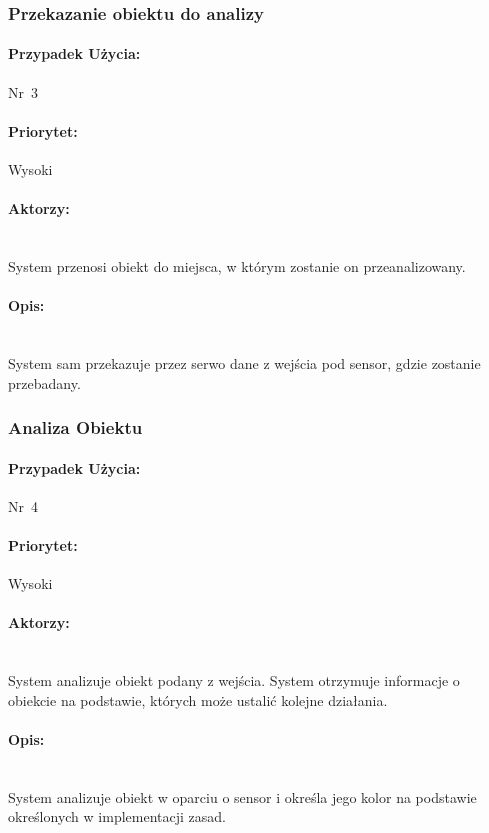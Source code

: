 \documentclass[12pt]{article}
\begin{document}
\subsubsection{Przekazanie obiektu do analizy}
\paragraph{Przypadek Użycia:}\mbox{Nr 3}
\paragraph{Priorytet:}\mbox{Wysoki}	
\paragraph{Aktorzy:}\mbox{} \\
System przenosi obiekt do miejsca, w którym zostanie on przeanalizowany.
\paragraph{Opis:}\mbox{} \\
System sam przekazuje przez serwo dane z wejścia pod sensor, gdzie zostanie przebadany.

\subsubsection{Analiza Obiektu}
\paragraph{Przypadek Użycia:}\mbox{Nr 4}
\paragraph{Priorytet:}\mbox{Wysoki}	
\paragraph{Aktorzy:}\mbox{} \\
System analizuje obiekt podany z wejścia. System otrzymuje informacje o obiekcie na podstawie, których może ustalić kolejne działania.
\paragraph{Opis:}\mbox{} \\
System analizuje obiekt w oparciu o sensor i określa jego kolor na podstawie określonych w implementacji zasad.
\end{document}
